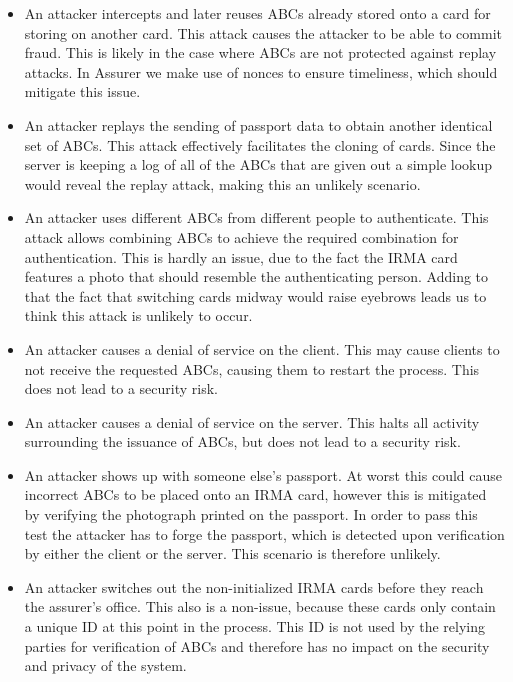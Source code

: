 \begin{itemize}
  \item An attacker intercepts and later reuses ABCs already stored onto a card for storing on another card. This attack causes the attacker to be able to commit fraud. This is likely in the case where ABCs are not protected against replay attacks. In Assurer we make use of nonces to ensure timeliness, which should mitigate this issue.
  \item An attacker replays the sending of passport data to obtain another identical set of ABCs. This attack effectively facilitates the cloning of cards. Since the server is keeping a log of all of the ABCs that are given out a simple lookup would reveal the replay attack, making this an unlikely scenario.
  \item An attacker uses different ABCs from different people to authenticate. This attack allows combining ABCs to achieve the required combination for authentication. This is hardly an issue, due to the fact the IRMA card features a photo that should resemble the authenticating person. Adding to that the fact that switching cards midway would raise eyebrows leads us to think this attack is unlikely to occur.
  \item An attacker causes a denial of service on the client. This may cause clients to not receive the requested ABCs, causing them to restart the process. This does not lead to a security risk.
  \item An attacker causes a denial of service on the server. This halts all activity surrounding the issuance of ABCs, but does not lead to a security risk.
  \item An attacker shows up with someone else's passport. At worst this could cause incorrect ABCs to be placed onto an IRMA card, however this is mitigated by verifying the photograph printed on the passport. In order to pass this test the attacker has to forge the passport, which is detected upon verification by either the client or the server. This scenario is therefore unlikely.
  \item An attacker switches out the non-initialized IRMA cards before they reach the assurer's office. This also is a non-issue, because these cards only contain a unique ID at this point in the process. This ID is not used by the relying parties for verification of ABCs and therefore has no impact on the security and privacy of the system.
\end{itemize}

